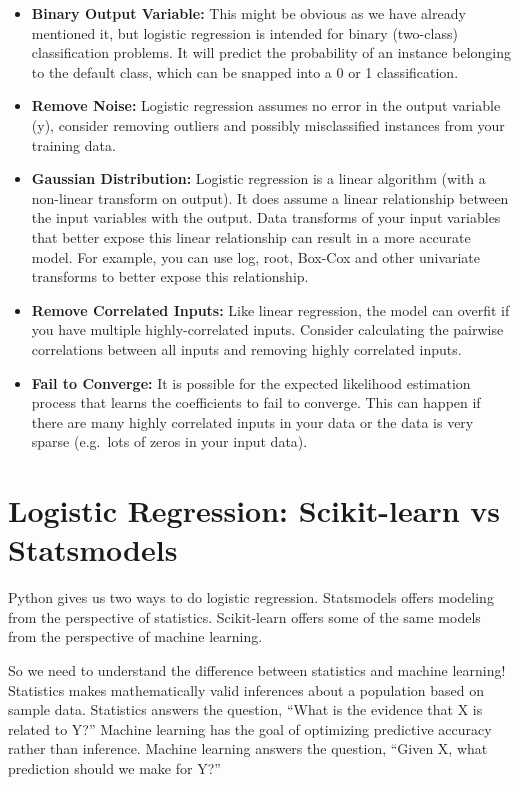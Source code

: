 \documentclass[
  letterpaper,
  DIV=11,
  numbers=noendperiod]{scrreprt}
\providecommand{\tightlist}{%
  \setlength{\itemsep}{0pt}\setlength{\parskip}{0pt}}\usepackage{longtable,booktabs,array}
\begin{document}
\begin{itemize}
\tightlist
\item
  \textbf{Binary Output Variable:} This might be obvious as we have
  already mentioned it, but logistic regression is intended for binary
  (two-class) classification problems. It will predict the probability
  of an instance belonging to the default class, which can be snapped
  into a 0 or 1 classification.
\item
  \textbf{Remove Noise:} Logistic regression assumes no error in the
  output variable (y), consider removing outliers and possibly
  misclassified instances from your training data.
\item
  \textbf{Gaussian Distribution:} Logistic regression is a linear
  algorithm (with a non-linear transform on output). It does assume a
  linear relationship between the input variables with the output. Data
  transforms of your input variables that better expose this linear
  relationship can result in a more accurate model. For example, you can
  use log, root, Box-Cox and other univariate transforms to better
  expose this relationship.
\item
  \textbf{Remove Correlated Inputs:} Like linear regression, the model
  can overfit if you have multiple highly-correlated inputs. Consider
  calculating the pairwise correlations between all inputs and removing
  highly correlated inputs.
\item
  \textbf{Fail to Converge:} It is possible for the expected likelihood
  estimation process that learns the coefficients to fail to converge.
  This can happen if there are many highly correlated inputs in your
  data or the data is very sparse (e.g.~lots of zeros in your input
  data).
\end{itemize}

\section{Logistic Regression: Scikit-learn vs
Statsmodels}\label{logistic-regression-scikit-learn-vs-statsmodels}

Python gives us two ways to do logistic regression. Statsmodels offers
modeling from the perspective of statistics. Scikit-learn offers some of
the same models from the perspective of machine learning.

So we need to understand the difference between statistics and machine
learning! Statistics makes mathematically valid inferences about a
population based on sample data. Statistics answers the question, ``What
is the evidence that X is related to Y?'' Machine learning has the goal
of optimizing predictive accuracy rather than inference. Machine
learning answers the question, ``Given X, what prediction should we make
for Y?''
\end{document}
